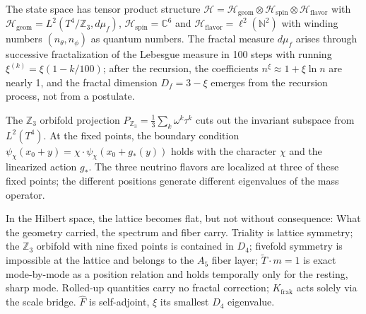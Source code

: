 The state space has tensor product structure
$\mathcal{H} = \mathcal{H}_{\mathrm{geom}}\otimes\mathcal{H}_{\mathrm{spin}}
\otimes\mathcal{H}_{\mathrm{flavor}}$ with
$\mathcal{H}_{\mathrm{geom}} = L^2(T^4/\mathbb{Z}_3,d\mu_f)$,
$\mathcal{H}_{\mathrm{spin}} = \mathbb{C}^6$ and
$\mathcal{H}_{\mathrm{flavor}} = \ell^2(\mathbb{N}^2)$ with winding numbers
$(n_\theta,n_\phi)$ as quantum numbers. The fractal measure $d\mu_f$ arises
through successive fractalization of the Lebesgue measure in 100 steps
with running $\xi^{(k)} = \xi(1-k/100)$; after the recursion, the
coefficients $n^\xi\approx1+\xi\ln n$ are nearly 1, and the fractal
dimension $D_f = 3-\xi$ emerges from the recursion process, not from
a postulate.

The $\mathbb{Z}_3$ orbifold projection $P_{\mathbb{Z}_3} = \frac13\sum_k
\omega^k\tau^k$ cuts out the invariant subspace from $L^2(T^4)$.
At the fixed points, the boundary condition
$\psi_\chi(x_0+y) = \chi\cdot\psi_\chi(x_0+g_*(y))$ holds with the character
$\chi$ and the linearized action $g_*$. The three neutrino flavors
are localized at three of these fixed points; the different
positions generate different eigenvalues of the
mass operator.

\begin{keypoint}
In the Hilbert space, the lattice becomes flat, but not without consequence: What
the geometry carried, the spectrum and fiber carry. Triality is
lattice symmetry; the $\mathbb{Z}_3$ orbifold with nine fixed points is contained
in $D_4$; fivefold symmetry is impossible at the lattice and belongs
to the $A_5$ fiber layer; $\tilde T\cdot m = 1$ is exact mode-by-mode as a
position relation and holds temporally only for the resting, sharp mode.
Rolled-up quantities carry no fractal correction; $K_{\mathrm{frak}}$
acts solely via the scale bridge. $\hat F$ is self-adjoint, $\xi$
its smallest $D_4$ eigenvalue.
\end{keypoint}

